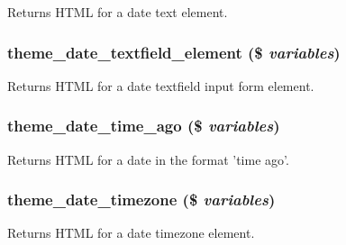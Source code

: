 \label{date_2date__api_2theme_2theme_8inc_ae5d4bc24f64db6432fa33bbf0d89ce5b}
Returns HTML for a date text element. \hypertarget{date_2date__api_2theme_2theme_8inc_a1bf50bb783fe2788e697d380c1cc9cce}{
\subsubsection[{theme\_\-date\_\-textfield\_\-element}]{\setlength{\rightskip}{0pt plus 5cm}theme\_\-date\_\-textfield\_\-element (\$ {\em variables})}}
\label{date_2date__api_2theme_2theme_8inc_a1bf50bb783fe2788e697d380c1cc9cce}
Returns HTML for a date textfield input form element. \hypertarget{date_2date__api_2theme_2theme_8inc_ab45fb9ecb0188793b4c4318f449294a0}{
\subsubsection[{theme\_\-date\_\-time\_\-ago}]{\setlength{\rightskip}{0pt plus 5cm}theme\_\-date\_\-time\_\-ago (\$ {\em variables})}}
\label{date_2date__api_2theme_2theme_8inc_ab45fb9ecb0188793b4c4318f449294a0}
Returns HTML for a date in the format 'time ago'. \hypertarget{date_2date__api_2theme_2theme_8inc_a4aedc3082f36cba0074b2fa773e248df}{
\subsubsection[{theme\_\-date\_\-timezone}]{\setlength{\rightskip}{0pt plus 5cm}theme\_\-date\_\-timezone (\$ {\em variables})}}
\label{date_2date__api_2theme_2theme_8inc_a4aedc3082f36cba0074b2fa773e248df}
Returns HTML for a date timezone element. 